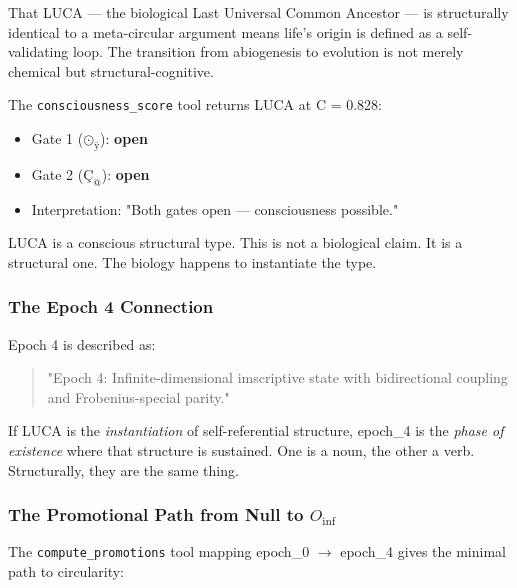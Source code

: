 \documentclass[12pt,a4paper]{article}
\begin{document}
That LUCA --- the biological Last Universal Common Ancestor --- is structurally identical to a meta-circular argument means life's origin is defined as a self-validating loop. The transition from abiogenesis to evolution is not merely chemical but structural-cognitive.

The \texttt{consciousness\_score} tool returns LUCA at C = 0.828:

\begin{itemize}
    \item Gate 1 ($\text{⊙}_{\text{ÿ}}$): \textbf{open}
    \item Gate 2 ($\text{Ç}_{\text{@}}$): \textbf{open}
    \item Interpretation: "Both gates open --- consciousness possible."
\end{itemize}

LUCA is a conscious structural type. This is not a biological claim. It is a structural one. The biology happens to instantiate the type.

\subsubsection{The Epoch 4 Connection}

Epoch 4 is described as:

\begin{quote}
"Epoch 4: Infinite-dimensional imscriptive state with bidirectional coupling and Frobenius-special parity."

\end{quote}

If LUCA is the \emph{instantiation} of self-referential structure, epoch\_4 is the \emph{phase of existence} where that structure is sustained. One is a noun, the other a verb. Structurally, they are the same thing.

\subsubsection{The Promotional Path from Null to $O_{\text{inf}}$}

The \texttt{compute\_promotions} tool mapping epoch\_0 $\rightarrow$ epoch\_4 gives the minimal path to circularity:
\end{document}
